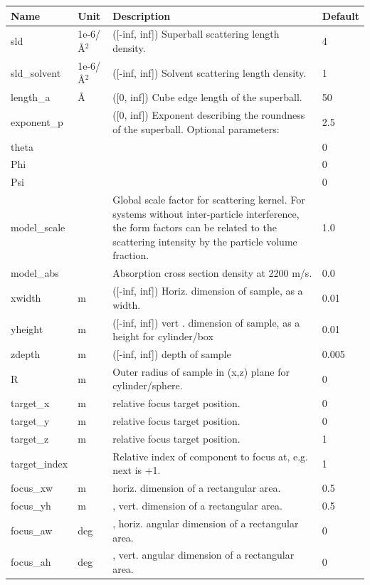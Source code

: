\begin{longtable}{p{}p{}p{}p{}}
\toprule
\textbf{Name} & \textbf{Unit} & \textbf{Description} & \textbf{Default} \\
\midrule
\endhead
sld & 1e-6/\AA{}$^{2}$ & ([-inf, inf]) Superball scattering length density. & 4 \\
sld\_solvent & 1e-6/\AA{}$^{2}$ & ([-inf, inf]) Solvent scattering length density. & 1 \\
length\_a & \AA{} & ([0, inf]) Cube edge length of the superball. & 50 \\
exponent\_p &  & ([0, inf]) Exponent describing the roundness of the superball. Optional parameters: & 2.5 \\
theta &  &  & 0 \\
Phi &  &  & 0 \\
Psi &  &  & 0 \\
model\_scale &   & Global scale factor for scattering kernel. For systems without inter-particle interference, the form factors can be related to the scattering intensity by the particle volume fraction. & 1.0 \\
model\_abs &   & Absorption cross section density at 2200 m/s. & 0.0 \\
xwidth & m & ([-inf, inf]) Horiz. dimension of sample, as a width. & 0.01 \\
yheight & m & ([-inf, inf]) vert . dimension of sample, as a height for cylinder/box & 0.01 \\
zdepth & m & ([-inf, inf]) depth of sample & 0.005 \\
R & m & Outer radius of sample in (x,z) plane for cylinder/sphere. & 0 \\
target\_x & m & relative focus target position. & 0 \\
target\_y & m & relative focus target position. & 0 \\
target\_z & m & relative focus target position. & 1 \\
target\_index &   & Relative index of component to focus at, e.g. next is +1. & 1 \\
focus\_xw & m & horiz. dimension of a rectangular area. & 0.5 \\
focus\_yh & m & , vert. dimension of a rectangular area. & 0.5 \\
focus\_aw & deg & , horiz. angular dimension of a rectangular area. & 0 \\
focus\_ah & deg & , vert. angular dimension of a rectangular area. & 0 \\

\end{longtable}
